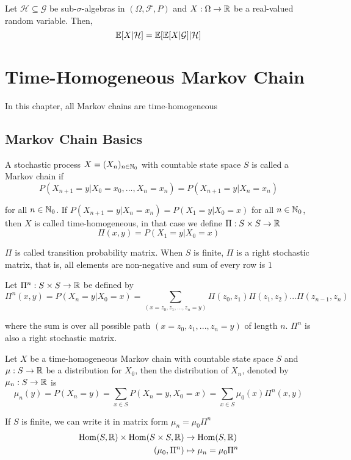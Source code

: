 \documentclass{report}
\begin{document}
\begin{proposition}
	Let $\mathcal{H} \subseteq \mathcal{G}$ be sub-$\sigma$-algebras in $(\Omega, \mathcal{F}, P)$ and $X: \Omega \to \mathbb{R}$ be a real-valued random variable. Then,
	$$
		\mathbb{E}[X | \mathcal{H}] = \mathbb{E}[\mathbb{E}[X | \mathcal{G}] | \mathcal{H}]
	$$
\end{proposition}

\chapter{Time-Homogeneous Markov Chain}

In this chapter, all Markov chains are time-homogeneous

\section{Markov Chain Basics}

\begin{definition}
    A stochastic process $X = (X_n)_{n \in \mathbb{N}_0}$ with countable state space $S$ is called a Markov chain if
    $$
        P(X_{n+1} = y | X_0 = x_0, ..., X_n = x_n) = P(X_{n+1} = y | X_n = x_n)
    $$

    for all $n \in \mathbb{N}_0$. If $P(X_{n+1} = y | X_n = x_n) = P(X_1 = y | X_0 = x)$ for all $n \in \mathbb{N}_0$, then $X$ is called time-homogeneous, in that case we define $\Pi: S \times S \to \mathbb{R}$
    $$
        \Pi(x, y) = P(X_1 = y | X_0 = x)
    $$

    $\Pi$ is called transition probability matrix. When $S$ is finite, $\Pi$ is a right stochastic matrix, that is, all elements are non-negative and sum of every row is $1$
\end{definition}

\begin{remark}[$n$-step]
	Let $\Pi^n: S \times S \to \mathbb{R}$ be defined by
	$$
		\Pi^n(x, y) = P(X_n = y | X_0 = x) = \sum_{(x = z_0, z_1, ..., z_n = y)} \Pi(z_0, z_1) \Pi(z_1, z_2) ... \Pi(z_{n-1}, z_n)
	$$
	
	where the sum is over all possible path $(x = z_0, z_1, ..., z_n = y)$ of length $n$. $\Pi^n$ is also a right stochastic matrix.
\end{remark}

\begin{proposition}
    Let $X$ be a time-homogeneous Markov chain with countable state space $S$ and $\mu: S \to \mathbb{R}$ be a distribution for $X_0$, then the distribution of $X_n$, denoted by $\mu_n: S \to \mathbb{R}$ is
    $$
        \mu_n(y) = P(X_n = y) = \sum_{x \in S} P(X_n = y, X_0 = x) = \sum_{x \in S} \mu_0(x) \Pi^n(x, y)
    $$
    
    If $S$ is finite, we can write it in matrix form $\mu_n = \mu_0 \Pi^n$
    \begin{align*}
		\operatorname{Hom}(S, \mathbb{R}) \times \operatorname{Hom}(S \times S, \mathbb{R}) &\to \operatorname{Hom}(S, \mathbb{R}) \\
		(\mu_0, \Pi^n) &\mapsto \mu_n = \mu_0 \Pi^n
    \end{align*}
\end{proposition}
\end{document}

